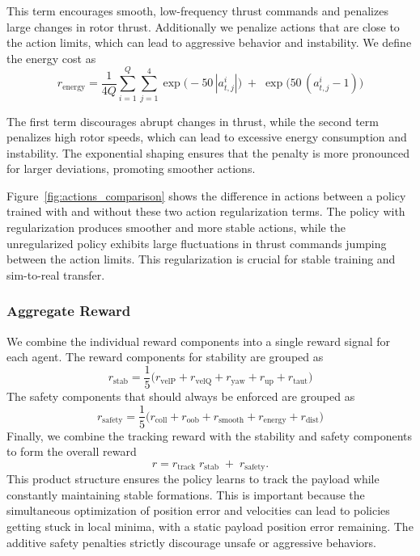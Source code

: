This term encourages smooth, low-frequency thrust commands and penalizes large changes in rotor thrust. Additionally we penalize actions that are close to the action limits, which can lead to aggressive behavior and instability. We define the energy cost as
\begin{equation}
r_{\mathrm{energy}} = \frac{1}{4Q}
\sum_{i=1}^{Q}\sum_{j=1}^{4}\exp\bigl(-50\,|a_{t,j}^i|\bigr)\;+\;\exp\bigl(50\,(a_{t,j}^i-1)\bigr)
\end{equation}

The first term discourages abrupt changes in thrust, while the second term penalizes high rotor speeds, which can lead to excessive energy consumption and instability. The exponential shaping ensures that the penalty is more pronounced for larger deviations, promoting smoother actions. 

Figure~\ref{fig:actions_comparison} shows the difference in actions between a policy trained with and without these two action regularization terms. The policy with regularization produces smoother and more stable actions, while the unregularized policy exhibits large fluctuations in thrust commands jumping between the action limits. This regularization is crucial for stable training and sim-to-real transfer.

\subsubsection{Aggregate Reward}
We combine the individual reward components into a single reward signal for each agent. The reward components for stability are grouped as
\begin{equation}
r_{\mathrm{stab}}
= \frac{1}{5}\bigl(r_{\mathrm{velP}} + r_{\mathrm{velQ}} + r_{\mathrm{yaw}} + r_{\mathrm{up}} + r_{\mathrm{taut}}\bigr)
\end{equation}
The safety components that should always be enforced are grouped as
\begin{equation}
r_{\mathrm{safety}}
= \frac{1}{5}\bigl(r_{\mathrm{coll}} + r_{\mathrm{oob}} + r_{\mathrm{smooth}} + r_{\mathrm{energy}} + r_{\mathrm{dist}}\bigr)
\end{equation}
Finally, we combine the tracking reward with the stability and safety components to form the overall reward
\begin{equation}
r
= r_{\mathrm{track}}\;r_{\mathrm{stab}}
\;+\;r_{\mathrm{safety}}.
\end{equation}
This product structure ensures the policy learns to track the payload while constantly maintaining stable formations. This is important because the simultaneous optimization of position error and velocities can lead to policies getting stuck in local minima, with a static payload position error remaining.
The additive safety penalties strictly discourage unsafe or aggressive behaviors.

